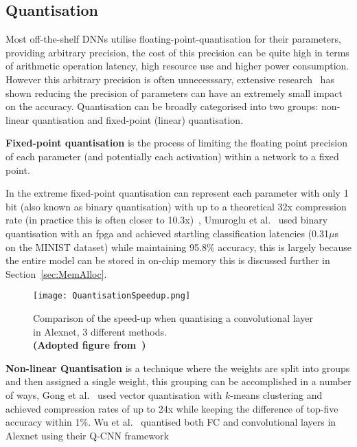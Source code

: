 \documentclass[../../D1.tex]{subfiles}
\begin{document}
\subsection{Quantisation}\label{sec:Quantisation}
Most off-the-shelf DNNs utilise floating-point-quantisation for their parameters, providing arbitrary precision, the cost of this precision can be quite high in terms of arithmetic operation latency, high resource use and higher power consumption.
However this arbitrary precision is often unnecesssary, extensive research~\autocite{jacobQuantizationTrainingNeural2018,maOptimizingLoopOperation2017} has shown reducing the precision of parameters can have an extremely small impact on the accuracy.
Quantisation can be broadly categorised into two groups: non-linear quantisation and fixed-point (linear) quantisation. 


\textbf{Fixed-point quantisation} is the process of limiting the floating point precision of each parameter (and potentially each activation) within a network to a fixed point. 

In the extreme fixed-point quantisation can represent each parameter with only 1 bit (also known as binary quantisation) with up to a theoretical 32x compression rate (in practice this is often closer to 10.3x)~\autocite{chenDeepLearningMobile2020}, Umuroglu et al.~\autocite{umurogluFINNFrameworkFast2017} used binary quantisation with an \acrshort{fpga} and achieved startling classification latencies (0.31$\mu$s on the MINIST dataset) while maintaining 95.8\% accuracy, this is largely because the entire model can be stored in on-chip memory this is discussed further in Section~\ref{sec:MemAlloc}.

\begin{figure}[H]
    \begin{center}
        \texttt{[image: QuantisationSpeedup.png]} 
    \end{center}
    
    \caption{Comparison of the speed-up when quantising a convolutional layer in Alexnet, 3 different methods.\\ \textbf{(Adopted figure from~\autocite{wuQuantizedConvolutionalNeural2016})}}
    \label{fig:QuantisationSpeedup}   
\end{figure}

\textbf{Non-linear Quantisation} is a technique where the weights are split into groups and then assigned a single weight, this grouping can be accomplished in a number of ways, Gong et al.~\autocite{gongCompressingDeepConvolutional2014} used vector quantisation with $k$-means clustering and achieved compression rates of up to 24x while keeping the difference of top-five accuracy within 1\%. Wu et al.~\autocite{wuQuantizedConvolutionalNeural2016} quantised both FC and convolutional layers in Alexnet using their Q-CNN framework
\end{document}
